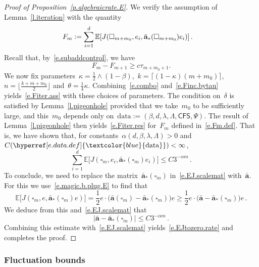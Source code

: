 \documentclass[11pt,twoside]{article} %
\let\oldsquare\square %
\renewcommand{\square}{\oldsquare}
\numberwithin{equation}{section}
\theoremstyle{definition}
\newcommand{\dataref}{\hyperref[e.data.def]{\textcolor{blue}{\ensuremath{\mathrm{data}}}}}
\let\originalleft\left
\let\originalright\right
\renewcommand{\left}{\mathopen{}\mathclose\bgroup\originalleft}
\renewcommand{\right}{\aftergroup\egroup\originalright}
\renewcommand{\a}{\mathbf{a}}
\newcommand{\ahom}{\bar{\a}}
\newcommand{\cu}{\square}
\newcommand{\E}{\mathbb{E}}
\newcommand{\data}{\mathrm{data}}
\newcommand{\CFS}{\mathsf{CFS}}
\begin{document}
\begin{proof}[{Proof of Proposition~\ref{p.algebraicrate.E}}]
We verify the assumption of Lemma~\ref{l.iteration} with the quantity
\begin{align}
\label{e.Fm.def}
F_m
& 
:= 
\sum_{i=1}^d \E \left[ J(\cu_{m+m_0},e_i,\ahom_*(\cu_{m+m_0})e_i) \right]
\,.
\end{align}
Recall that, by~\eqref{e.subaddcontrol}, we have
\begin{equation}
\label{e.Finc.bytau}
F_m - F_{m+1}
\geq 
c
\tau_{m+ m_0 + 1}
.
\end{equation}
We now fix parameters~$\kappa = \frac12 \wedge (1-\beta)$,~$k = \lceil (1-\kappa) (m+m_0) \rceil$,~$n = \lfloor \frac{k + m + m_0}{2} \rfloor$  and~$\theta = \frac14 \kappa$. 
Combining~\eqref{e.combo} and~\eqref{e.Finc.bytau} yields~\eqref{e.Fiter.ass} with these choices of parameters. The condition on~$\delta$ is satisfied by Lemma~\ref{l.pigeonhole} provided that we take~$m_0$ to be sufficiently large, and this~$m_0$ depends only on~$\data := (\beta,d,\lambda,\Lambda,\CFS,\Psi)$. The result of Lemma~\ref{l.pigeonhole} then yields~\eqref{e.Fiter.res} for~$F_m$ defined in~\eqref{e.Fm.def}.
That is, we have shown that, for constants~$\alpha(d,\beta,\lambda,\Lambda)>0$ and~$C(\dataref)<\infty$,
\begin{equation}
\label{e.EJ.scalemat}
\sum_{i=1}^d \E \bigl[ J(\cu_{m},e_i,\ahom_*(\cu_{m})e_i) \bigr]
\leq
C 3^{-\alpha m} \,.
\end{equation}
To conclude, we need to replace the matrix~$\ahom_*(\cu_{m})$ in~\eqref{e.EJ.scalemat} with~$\ahom$. 
For this we use~\eqref{e.magic.b.plug.E} to find that 
\begin{equation*}
\E \bigl[ J(\cu_{m},e,\ahom_*(\cu_{m})e) \bigr]
=
\frac12 e \cdot \bigl( \ahom(\cu_m) - \ahom_*(\cu_m) \bigr) e
\geq 
\frac 12 e \cdot \bigl( \ahom - \ahom_*(\cu_m) \bigr) e
\,.
\end{equation*}
We deduce from this and~\eqref{e.EJ.scalemat} that 
\begin{equation*}
| \ahom - \ahom_*(\cu_m) |
\leq C 3^{-\alpha m} \,.
\end{equation*}
Combining this estimate with~\eqref{e.EJ.scalemat} yields~\eqref{e.EJtozero.rate} and completes the proof. 
\end{proof}



\subsubsection{Fluctuation bounds}
\end{document}
